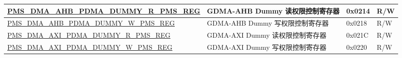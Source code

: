 \begin{longtable}{ | L{7.5cm} | L{6cm} | L{1.3cm} | L{1cm} | }
\hyperref[regdesc:PMSDMAAHBPDMADUMMYRPMSREG]{PMS\_DMA\_AHB\_PDMA\_DUMMY\_R\_PMS\_REG} & GDMA-AHB Dummy 读权限控制寄存器 & 0x0214 & R/W \\ \hline
\hyperref[regdesc:PMSDMAAHBPDMADUMMYWPMSREG]{PMS\_DMA\_AHB\_PDMA\_DUMMY\_W\_PMS\_REG} & GDMA-AHB Dummy 写权限控制寄存器 & 0x0218 & R/W \\ \hline
\hyperref[regdesc:PMSDMAAXIPDMADUMMYRPMSREG]{PMS\_DMA\_AXI\_PDMA\_DUMMY\_R\_PMS\_REG} & GDMA-AXI Dummy 读权限控制寄存器 & 0x021C & R/W \\ \hline
\hyperref[regdesc:PMSDMAAXIPDMADUMMYWPMSREG]{PMS\_DMA\_AXI\_PDMA\_DUMMY\_W\_PMS\_REG} & GDMA-AXI Dummy 写权限控制寄存器 & 0x0220 & R/W \\ \hline
\end{longtable}
